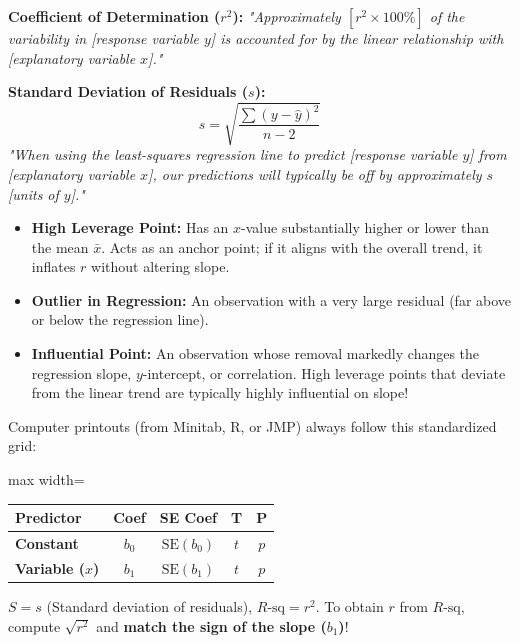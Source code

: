 \begin{lessonbox}
\begin{frqrubricbox}
\textbf{Coefficient of Determination ($r^2$):}
\textit{"Approximately $[r^2 \times 100\%]$ of the variability in [response variable $y$] is accounted for by the linear relationship with [explanatory variable $x$]."}

\textbf{Standard Deviation of Residuals ($s$):}
\begin{equation}
  s = \sqrt{\frac{\sum (y - \hat{y})^2}{n - 2}}
\end{equation}
\textit{"When using the least-squares regression line to predict [response variable $y$] from [explanatory variable $x$], our predictions will typically be off by approximately $s$ [units of $y$]."}
\end{frqrubricbox}
\end{lessonbox}

\begin{lessonbox}
\begin{itemize}[leftmargin=1.2em]
  \item \textbf{High Leverage Point:} Has an $x$-value substantially higher or lower than the mean $\bar{x}$. Acts as an anchor point; if it aligns with the overall trend, it inflates $r$ without altering slope.
  \item \textbf{Outlier in Regression:} An observation with a very large residual (far above or below the regression line).
  \item \textbf{Influential Point:} An observation whose removal markedly changes the regression slope, $y$-intercept, or correlation. High leverage points that deviate from the linear trend are typically highly influential on slope!
\end{itemize}
\end{lessonbox}

\begin{lessonbox}
Computer printouts (from Minitab, R, or JMP) always follow this standardized grid:
\begin{center}
\begin{adjustbox}{max width=\linewidth}
\begin{tabular}{lcccc}
\toprule
\textbf{Predictor} & \textbf{Coef} & \textbf{SE Coef} & \textbf{T} & \textbf{P} \\
\midrule
\textbf{Constant} & $b_0$ & $\text{SE}(b_0)$ & $t$ & $p$ \\
\textbf{Variable ($x$)} & $b_1$ & $\text{SE}(b_1)$ & $t$ & $p$ \\
\bottomrule
\end{tabular}
\end{adjustbox}
\end{center}
$S = s$ (Standard deviation of residuals), $R\text{-sq} = r^2$.
To obtain $r$ from $R\text{-sq}$, compute $\sqrt{r^2}$ and \textbf{match the sign of the slope ($b_1$)}!
\end{lessonbox}

